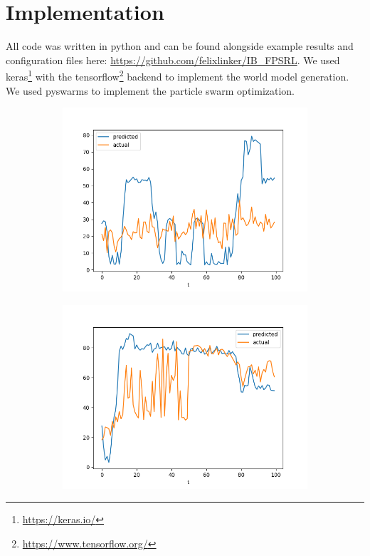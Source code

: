 \documentclass[runningheads]{llncs}
\begin{document}
    \section{Implementation}

    All code was written in python and can be found alongside example results and configuration files here: \url{https://github.com/felixlinker/IB_FPSRL}.
    We used keras\footnote{\url{https://keras.io/}} with the tensorflow\footnote{\url{https://www.tensorflow.org/}} backend to implement the world model generation.
    We used pyswarms \cite{Miranda2018} to implement the particle swarm optimization.

    \newcommand{\figwidth}{0.45\textwidth}

    \begin{figure}[hp]
        \centering
        \begin{subfigure}{\figwidth}
            \includegraphics[width=\textwidth]{results/evaluation/f_model_graph_p10.png}
        \end{subfigure}
        \begin{subfigure}{\figwidth}
            \includegraphics[width=\textwidth]{results/evaluation/f_model_graph_p20.png}

\end{subfigure}
\end{figure}
\end{document}
